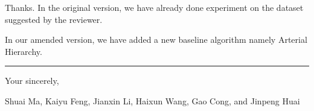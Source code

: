 \documentclass[11pt]{letter}
\begin{document}
Thanks. In the original version, we have already done experiment on the dataset suggested by the reviewer.

In our amended version, we have added a new baseline algorithm namely Arterial Hierarchy.



\vspace{3.6ex}
\hrule
\vspace{3.6ex}
\closing{Your sincerely,}

\vspace{-8ex}
Shuai Ma, Kaiyu Feng, Jianxin Li, Haixun Wang, Gao Cong, and Jinpeng Huai
\end{document}
